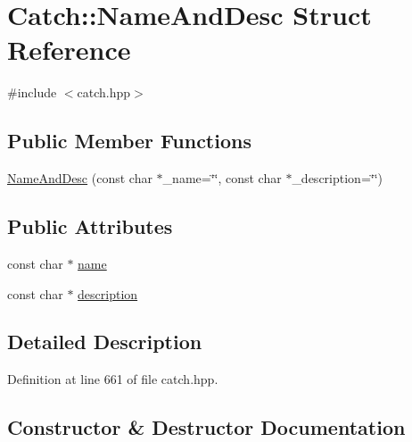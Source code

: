 \hypertarget{struct_catch_1_1_name_and_desc}{}\section{Catch\+:\+:Name\+And\+Desc Struct Reference}
\label{struct_catch_1_1_name_and_desc}


{\ttfamily \#include $<$catch.\+hpp$>$}

\subsection*{Public Member Functions}
\begin{DoxyCompactItemize}
\item 
\hyperlink{struct_catch_1_1_name_and_desc_a189ceb9942fb5f6635140d6a09fc843a}{Name\+And\+Desc} (const char $\ast$\+\_\+name=\char`\"{}\char`\"{}, const char $\ast$\+\_\+description=\char`\"{}\char`\"{})
\end{DoxyCompactItemize}
\subsection*{Public Attributes}
\begin{DoxyCompactItemize}
\item 
const char $\ast$ \hyperlink{struct_catch_1_1_name_and_desc_a374b4ed8be3cf98be20ebde5273bde51}{name}
\item 
const char $\ast$ \hyperlink{struct_catch_1_1_name_and_desc_a3463a23ff65ce494fc380452b57b7970}{description}
\end{DoxyCompactItemize}


\subsection{Detailed Description}


Definition at line 661 of file catch.\+hpp.



\subsection{Constructor \& Destructor Documentation}
\hypertarget{struct_catch_1_1_name_and_desc_a189ceb9942fb5f6635140d6a09fc843a}{}\label{struct_catch_1_1_name_and_desc_a189ceb9942fb5f6635140d6a09fc843a} 
